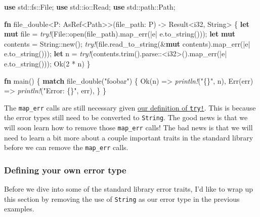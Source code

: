 \documentclass[a4paper,]{book}
\newenvironment{Shaded}{\begin{snugshade}}{\end{snugshade}}
\newcommand{\KeywordTok}[1]{\textcolor[rgb]{0.13,0.29,0.53}{\textbf{{#1}}}}
\newcommand{\DataTypeTok}[1]{\textcolor[rgb]{0.13,0.29,0.53}{{#1}}}
\newcommand{\DecValTok}[1]{\textcolor[rgb]{0.00,0.00,0.81}{{#1}}}
\newcommand{\ConstantTok}[1]{\textcolor[rgb]{0.00,0.00,0.00}{{#1}}}
\newcommand{\StringTok}[1]{\textcolor[rgb]{0.31,0.60,0.02}{{#1}}}
\newcommand{\PreprocessorTok}[1]{\textcolor[rgb]{0.56,0.35,0.01}{\textit{{#1}}}}
\newcommand{\NormalTok}[1]{{#1}}
\begin{document}
\begin{Shaded}
\begin{Highlighting}[]
\KeywordTok{use} \NormalTok{std::fs::File;}
\KeywordTok{use} \NormalTok{std::io::Read;}
\KeywordTok{use} \NormalTok{std::path::Path;}

\KeywordTok{fn} \NormalTok{file_double<P: AsRef<Path>>(file_path: P) -> }\DataTypeTok{Result}\NormalTok{<}\DataTypeTok{i32}\NormalTok{, }\DataTypeTok{String}\NormalTok{> \{}
    \KeywordTok{let} \KeywordTok{mut} \NormalTok{file = }\PreprocessorTok{try!}\NormalTok{(File::open(file_path).map_err(|e| e.to_string()));}
    \KeywordTok{let} \KeywordTok{mut} \NormalTok{contents = }\DataTypeTok{String}\NormalTok{::new();}
    \PreprocessorTok{try!}\NormalTok{(file.read_to_string(&}\KeywordTok{mut} \NormalTok{contents).map_err(|e| e.to_string()));}
    \KeywordTok{let} \NormalTok{n = }\PreprocessorTok{try!}\NormalTok{(contents.trim().parse::<}\DataTypeTok{i32}\NormalTok{>().map_err(|e| e.to_string()));}
    \ConstantTok{Ok}\NormalTok{(}\DecValTok{2} \NormalTok{* n)}
\NormalTok{\}}

\KeywordTok{fn} \NormalTok{main() \{}
    \KeywordTok{match} \NormalTok{file_double(}\StringTok{"foobar"}\NormalTok{) \{}
        \ConstantTok{Ok}\NormalTok{(n) => }\PreprocessorTok{println!}\NormalTok{(}\StringTok{"\{\}"}\NormalTok{, n),}
        \ConstantTok{Err}\NormalTok{(err) => }\PreprocessorTok{println!}\NormalTok{(}\StringTok{"Error: \{\}"}\NormalTok{, err),}
    \NormalTok{\}}
\NormalTok{\}}
\end{Highlighting}
\end{Shaded}

The \texttt{map\_err} calls are still necessary given
\protect\hyperlink{code-try-def-simple}{our definition of
\texttt{try!}}. This is because the error types still need to be
converted to \texttt{String}. The good news is that we will soon learn
how to remove those \texttt{map\_err} calls! The bad news is that we
will need to learn a bit more about a couple important traits in the
standard library before we can remove the \texttt{map\_err} calls.

\hypertarget{defining-your-own-error-type}{\subsubsection{Defining your
own error type}\label{defining-your-own-error-type}}

Before we dive into some of the standard library error traits, I'd like
to wrap up this section by removing the use of \texttt{String} as our
error type in the previous examples.
\end{document}
